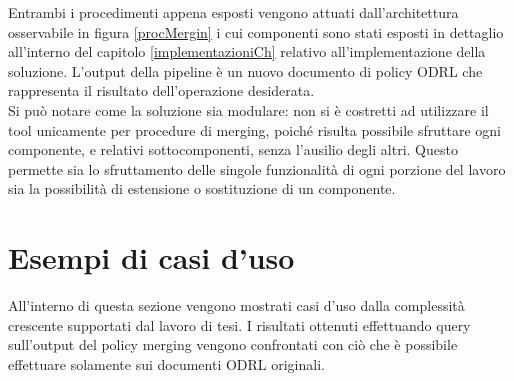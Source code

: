 \documentclass[12pt,a4paper,twoside]{book}
\begin{document}
Entrambi i procedimenti appena esposti vengono attuati dall'architettura osservabile in figura \ref{procMergin} i cui componenti sono stati esposti in dettaglio all'interno del capitolo \ref{implementazioniCh} relativo all'implementazione della soluzione. L'output della pipeline è un nuovo documento di policy ODRL che rappresenta il risultato dell'operazione desiderata.\\
Si può notare come la soluzione sia modulare: non si è costretti ad utilizzare il tool unicamente per procedure di merging, poiché risulta possibile sfruttare ogni componente, e relativi sottocomponenti, senza l'ausilio degli altri. Questo permette sia lo sfruttamento delle singole funzionalità di ogni porzione del lavoro sia la possibilità di estensione o sostituzione di un componente.\\
\section{Esempi di casi d'uso}
All'interno di questa sezione vengono mostrati casi d'uso dalla complessità crescente supportati dal lavoro di tesi. I risultati ottenuti effettuando query sull'output del policy merging vengono confrontati con ciò che è possibile effettuare solamente sui documenti ODRL originali.
\end{document}

